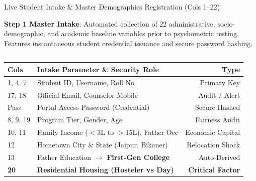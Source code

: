 \documentclass{beamer}
\begin{document}
\begin{frame}[t]{Live Student Intake \& Master Demographics Registration (Cols 1--22)}
  \vspace{-0.25cm}
  \begin{topsummarybar}
    \fontsize{5.8pt}{7.0pt}\selectfont
    \textbf{\color{NavyDark}Step 1 Master Intake}: Automated collection of 22 administrative, socio-demographic, and academic baseline variables prior to psychometric testing. Features instantaneous student credential issuance and secure password hashing.
  \end{topsummarybar}
  \vspace{-0.2cm}

  \begin{columns}[T]
    \begin{column}{0.49\textwidth}
      \begin{tcolorbox}[colback=white, colframe=BlueDeep, arc=1.2mm, boxrule=0.8pt, top=0.5mm, bottom=0.5mm, left=0.8mm, right=0.8mm, title={\scriptsize\bfseries\color{white}Administrative \& Demographic Intake (Cols 1--13, 17--20)}, colbacktitle=BlueDeep]
        \fontsize{4.6pt}{5.6pt}\selectfont
        \renewcommand{\arraystretch}{0.65}
        \begin{tabularx}{\linewidth}{@{}l X r@{}}
          \toprule
          \textbf{Cols} & \textbf{Intake Parameter \& Security Role} & \textbf{Type} \\
          \midrule
          \rowcolor{BlueLight} 1, 4, 7 & Student ID, Username, Roll No & Primary Key \\
          \rowcolor{BlueLight} 17, 18 & Official Email, Counselor Mobile & Audit / Alert \\
          \rowcolor{BlueLight} Pass & Portal Access Password (Credential) & Secure Hashed \\
          \midrule
          \rowcolor{CanvasBG} 8, 9, 19 & Program Tier, Gender, Age & Fairness Audit \\
          \rowcolor{CanvasBG} 10, 11 & Family Income ($<$3L to $>$15L), Father Occ & Economic Capital \\
          \rowcolor{CanvasBG} 12 & Hometown City \& State (Jaipur, Bikaner) & Relocation Shock \\
          \rowcolor{CanvasBG} 13 & Father Education $\to$ \textbf{First-Gen College} & Auto-Derived \\
          \rowcolor{GoldBG} \textbf{20} & \textbf{Residential Housing (Hosteler vs Day)} & \textbf{Critical Factor} \\
          \bottomrule
        \end{tabularx}
      \end{tcolorbox}
    \end{column}


\end{columns}
\end{frame}
\end{document}
